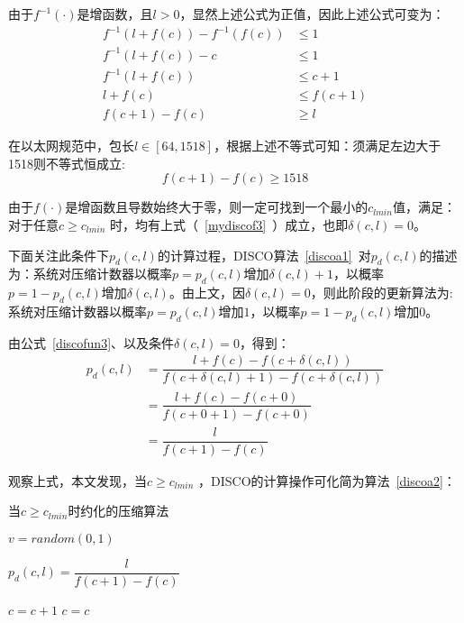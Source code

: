 %

由于$f^{-1}(\cdot)$是增函数，且$l>0$，显然上述公式为正值，因此上述公式可变为：
\begin{align}\label{mydiscof2}
f^{-1}(l+f(c)) - f^{-1}(f(c)) &\leq 1 \nonumber  \\
f^{-1}(l+f(c)) - c &\leq 1 \nonumber  \\
f^{-1}(l+f(c))  &\leq c + 1  \nonumber \\
l+f(c) &\leq f(c+1) \nonumber  \\
f(c+1) - f(c) &\geq l
\end{align}

在以太网规范中，包长$l \in [64,1518]$，根据上述不等式可知：须满足左边大于1518则不等式恒成立:
\begin{equation} \label{mydiscof3}
f(c+1) - f(c) \geq 1518
\end{equation}

由于$ f(\cdot) $是增函数且导数始终大于零，则一定可找到一个最小的$ c_{lmin} $值，满足：对于任意$ c \geq c_{lmin} $ 时，均有上式（~\ref{mydiscof3}~）成立，也即$\delta(c,l) =0$。

下面关注此条件下$ p_d(c,l) $的计算过程，DISCO算法~\ref{discoa1}~对$ p_d(c,l) $的描述为：系统对压缩计数器以概率$p= p_d(c,l) $增加$\delta(c,l) +1$，以概率$p=1- p_d(c,l) $增加$\delta(c,l)$。由上文，因$ \delta(c,l)=0$，则此阶段的更新算法为:系统对压缩计数器以概率$p= p_d(c,l) $增加$1$，以概率$p=1- p_d(c,l) $增加$0$。

由公式~\ref{discofun3}、以及条件$ \delta(c,l)=0$，得到：
\begin{align}\label{mydiscof4}
p_d(c,l) &= \dfrac{l+f(c)-f(c+\delta(c,l))}{f(c+\delta(c,l)+1)-f(c+\delta(c,l))}  \nonumber \\
&= \dfrac{l+f(c)-f(c+0)}{f(c+0+1)-f(c+0)} \nonumber  \\
&= \dfrac{l}{f(c+1)-f(c)} 
\end{align}



观察上式，本文发现，当$ c \geq c_{lmin} $ ，DISCO的计算操作可化简为算法~\ref{discoa2}：

\begin{algorithm}[ht]
	\caption{当$ c \geq c_{lmin} $时约化的压缩算法 \label{discoa2}}
	\IncMargin{2em}
	\DontPrintSemicolon
	$ v = random(0,1) $

	$ p_d(c,l)=\dfrac{l}{f(c+1)-f(c)} $ 
	
	{$ c = c +  1 $ }
	{$ c = c   $ }
\end{algorithm}

